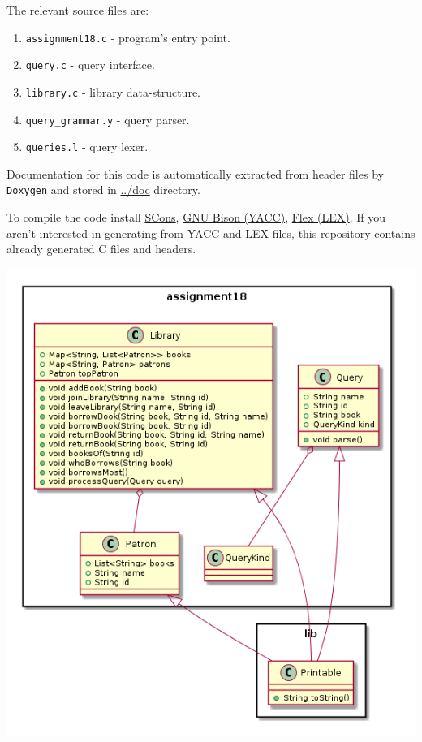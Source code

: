 \documentclass[11pt]{article}
\begin{document}
The relevant source files are:
\begin{enumerate}
\item \texttt{assignment18.c} - program's entry point.
\item \texttt{query.c} - query interface.
\item \texttt{library.c} - library data-structure.
\item \texttt{query\_grammar.y} - query parser.
\item \texttt{queries.l} - query lexer.
\end{enumerate}

Documentation for this code is automatically extracted from header files by
\texttt{Doxygen} and stored in \url{../doc} directory.

To compile the code install \href{http://scons.org/doc/0.98.4/HTML/scons-user/x166.html}{SCons}, \href{https://geeksww.com/tutorials/miscellaneous/bison_gnu_parser_generator/installation/installing_bison_gnu_parser_generator_ubuntu_linux.php}{GNU Bison (YACC)}, \href{http://flex.sourceforge.net/}{Flex (LEX)}.  If you
aren't interested in generating from YACC and LEX files, this repository
contains already generated C files and headers.

\includegraphics[width=.9\linewidth]{tryout.png}
\end{document}
